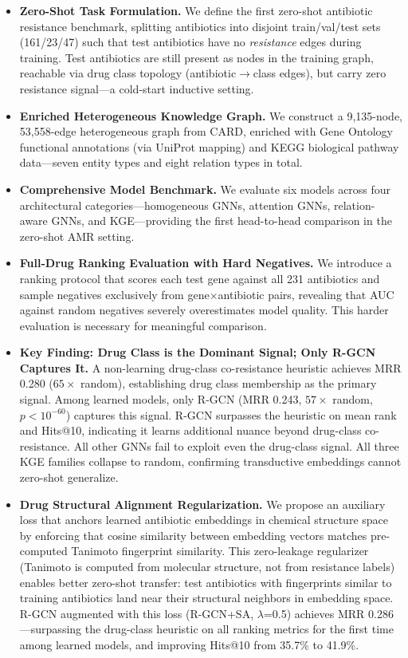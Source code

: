 \documentclass[conference]{IEEEtran}
\begin{document}
\begin{itemize}

\item \textbf{Zero-Shot Task Formulation.} We define the first zero-shot antibiotic resistance benchmark, splitting antibiotics into disjoint train/val/test sets (161/23/47) such that test antibiotics have no \textit{resistance} edges during training. Test antibiotics are still present as nodes in the training graph, reachable via drug class topology (antibiotic$\to$class edges), but carry zero resistance signal---a cold-start inductive setting.

\item \textbf{Enriched Heterogeneous Knowledge Graph.} We construct a 9,135-node, 53,558-edge heterogeneous graph from CARD, enriched with Gene Ontology functional annotations (via UniProt mapping) and KEGG biological pathway data---seven entity types and eight relation types in total.

\item \textbf{Comprehensive Model Benchmark.} We evaluate six models across four architectural categories---homogeneous GNNs, attention GNNs, relation-aware GNNs, and KGE---providing the first head-to-head comparison in the zero-shot AMR setting.

\item \textbf{Full-Drug Ranking Evaluation with Hard Negatives.} We introduce a ranking protocol that scores each test gene against all 231 antibiotics and sample negatives exclusively from gene$\times$antibiotic pairs, revealing that AUC against random negatives severely overestimates model quality. This harder evaluation is necessary for meaningful comparison.

\item \textbf{Key Finding: Drug Class is the Dominant Signal; Only R-GCN Captures It.} A non-learning drug-class co-resistance heuristic achieves MRR 0.280 ($65\times$ random), establishing drug class membership as the primary signal. Among learned models, only R-GCN (MRR 0.243, $57\times$ random, $p < 10^{-60}$) captures this signal. R-GCN surpasses the heuristic on mean rank and Hits@10, indicating it learns additional nuance beyond drug-class co-resistance. All other GNNs fail to exploit even the drug-class signal. All three KGE families collapse to random, confirming transductive embeddings cannot zero-shot generalize.

\item \textbf{Drug Structural Alignment Regularization.} We propose an auxiliary loss that anchors learned antibiotic embeddings in chemical structure space by enforcing that cosine similarity between embedding vectors matches pre-computed Tanimoto fingerprint similarity. This zero-leakage regularizer (Tanimoto is computed from molecular structure, not from resistance labels) enables better zero-shot transfer: test antibiotics with fingerprints similar to training antibiotics land near their structural neighbors in embedding space. R-GCN augmented with this loss (R-GCN+SA, $\lambda$=0.5) achieves MRR 0.286---surpassing the drug-class heuristic on all ranking metrics for the first time among learned models, and improving Hits@10 from 35.7\% to 41.9\%.


\end{itemize}
\end{document}
